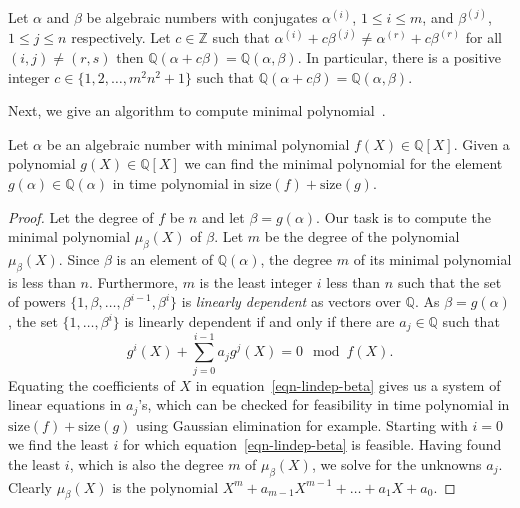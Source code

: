 \documentclass[prodmod,acmtalg]{acmsmall}
\newcommand{\size}[1]{{\ensuremath{\mathrm{size}\left(#1\right)}}}
\newcommand{\Q}{\ensuremath{\mathbb{Q}}}
\newcommand{\Z}{\ensuremath{\mathbb{Z}}}
\begin{document}
\begin{lemma}\label{lem-combine-fields}
  Let $\alpha$ and $\beta$ be algebraic numbers with conjugates
  $\alpha^{(i)}$, $1\leq i \leq m$, and $\beta^{(j)}$, $1 \leq j \leq
  n$ respectively. Let $c\in\Z$ such that $\alpha^{(i)} + c\beta^{(j)}
  \neq \alpha^{(r)} + c \beta^{(r)}$ for all $ (i,j) \neq (r,s)$ then
  $\Q(\alpha + c\beta) = \Q(\alpha,\beta)$. In particular, there is a
  positive integer $c\in\{1,2,\ldots,m^2n^2+1\}$ such that $\Q(\alpha
  + c\beta) = \Q(\alpha,\beta)$.
\end{lemma}

Next, we give an algorithm to compute minimal
polynomial~\cite{Shoup1999minimalpolynomial}.

\begin{lemma}\label{min-poly-find}
  Let $\alpha$ be an algebraic number with minimal polynomial
  $f(X)\in\Q[X]$. Given a polynomial $g(X)\in\Q[X]$ we can find the
  minimal polynomial for the element $g(\alpha)\in\Q(\alpha)$ in time
  polynomial in $\size{f}+\size{g}$.
\end{lemma}

\begin{proof}
  Let the degree of $f$ be $n$ and let $\beta = g(\alpha)$. Our task
  is to compute the minimal polynomial $\mu_\beta(X)$ of $\beta$. Let
  $m$ be the degree of the polynomial $\mu_\beta(X)$. Since $\beta$ is
  an element of $\Q(\alpha)$, the degree $m$ of its minimal polynomial
  is less than $n$. Furthermore, $m$ is the least integer $i$ less
  than $n$ such that the set of powers $\{ 1,\beta,\ldots,
  \beta^{i-1}, \beta^i \}$ is \emph{linearly dependent} as vectors
  over $\Q$. As $\beta = g(\alpha)$, the set $\{1, \ldots, \beta^i \}$
  is linearly dependent if and only if there are $a_j \in \Q$ such
  that
  \begin{equation}\label{eqn-lindep-beta}
    g^i(X)+\sum_{j=0}^{i-1} a_j g^j(X) = 0 \mod{f(X)}.
  \end{equation}
  Equating the coefficients of $X$ in equation~\ref{eqn-lindep-beta}
  gives us a system of linear equations in $a_j$'s, which can be
  checked for feasibility in time polynomial in $\size{f}+\size{g}$
  using Gaussian elimination for example. Starting with $i = 0$ we
  find the least $i$ for which equation~\ref{eqn-lindep-beta} is
  feasible. Having found the least $i$, which is also the degree $m$
  of $\mu_\beta(X)$, we solve for the unknowns $a_j$. Clearly
  $\mu_\beta(X)$ is the polynomial $X^m + a_{m-1} X^{m-1} + \ldots +
  a_1 X + a_0$.
\end{proof}
\end{document}
